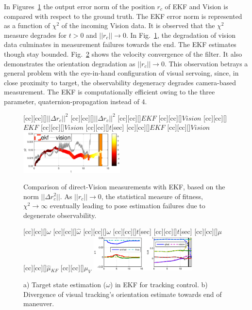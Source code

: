 In Figures~\ref{fig:fig_norm_errors} the output error norm of the position $r_c$ of EKF and Vision is compared with respect to the ground truth. The EKF error norm is represented as a function  of $\chi^2$ of the incoming Vision data. It is observed that the $\chi^2$ measure degrades for $t > 0 $ and $||r_c|| \rightarrow 0 $. In Fig.~\ref{fig:fig_norm_errors}, the degradation of vision data culminates in measurement failures towards the end. The EKF estimates though stay bounded. Fig.~\ref{fig:states_EKF} shows the velocity convergence of the filter. It also demonstrates the orientation degradation as $||r_c|| \rightarrow 0$. This observation betrays a general problem with the eye-in-hand configuration of visual servoing, since, in close proximity to target, the observability degeneracy degrades camera-based measurement. The EKF is computationally efficient owing to the three parameter, quaternion-propagation instead of 4. 
%
\begin{figure}[t!]
[cc][cc][\FontFigB]{$||\Delta r_c||^2$}
[cc][cc][\FontFigB]{$||\Delta r_c||^2$}
[cc][cc][\FontFigM]{$EKF$}
[cc][cc][\FontFigM]{$Vision$}
[cc][cc][\FontFigM]{$EKF$}
[cc][cc][\FontFigM]{$Vision$}
[cc][cc][\FontFigB]{$t$[sec]}
[cc][cc][\FontFigM]{$EKF$}
[cc][cc][\FontFigM]{$Vision$}
\centering\includegraphics[angle=0,width=0.47\textwidth]{./figures/fig_norm_errors}
\caption{Comparison of direct-Vision measurements with EKF, based on the norm $||\Delta r_c^2||$. As $||r_c|| \rightarrow 0$, the statistical measure of fitness, $\chi^2 \rightarrow \infty $ eventually leading to pose estimation failures due to degenerate observability.}
\label{fig:fig_norm_errors}
\end{figure}
%
%
\begin{figure}[t!]
[cc][cc][\FontFigB]{$\omega$}
[cc][cc][\FontFigB]{$\hat{\omega}$}
[cc][cc][\FontFigB]{$\omega$}
[cc][cc][\FontFigB]{$t$[sec]}
[cc][cc][\FontFigB]{$t$[sec]}
[cc][cc][\FontFigB]{$\mu$}
[cc][cc][\FontFigB]{$\hat{\mu}{}_{KF}$}
[cc][cc][\FontFigB]{$\mu_V$}
\centering\includegraphics[angle=0,width=0.48\textwidth]{./figures/states_EKF}
\caption{a) Target state estimation ($\omega$) in EKF for tracking control. b) Divergence of visual tracking's orientation estimate towards end of maneuver.}
\label{fig:states_EKF}
\end{figure}
%
